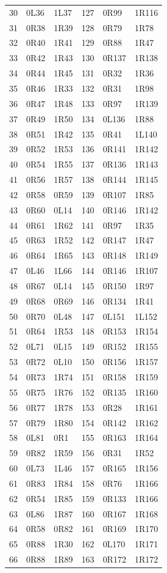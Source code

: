{\begin{longtable}{@{}rll@{\hspace{32pt}}rll@{}}
30&0L36&1L37&127&0R99&1R116\\
31&0R38&1R39&128&0R79&1R78\\
32&0R40&1R41&129&0R88&1R47\\
33&0R42&1R43&130&0R137&1R138\\
34&0R44&1R45&131&0R32&1R36\\
35&0R46&1R33&132&0R31&1R98\\
36&0R47&1R48&133&0R97&1R139\\
37&0R49&1R50&134&0L136&1R88\\
38&0R51&1R42&135&0R41&1L140\\
39&0R52&1R53&136&0R141&1R142\\
40&0R54&1R55&137&0R136&1R143\\
41&0R56&1R57&138&0R144&1R145\\
42&0R58&0R59&139&0R107&1R85\\
43&0R60&0L14&140&0R146&1R142\\
44&0R61&1R62&141&0R97&1R35\\
45&0R63&1R52&142&0R147&1R47\\
46&0R64&1R65&143&0R148&1R149\\
47&0L46&1L66&144&0R146&1R107\\
48&0R67&0L14&145&0R150&1R97\\
49&0R68&0R69&146&0R134&1R41\\
50&0R70&0L48&147&0L151&1L152\\
51&0R64&1R53&148&0R153&1R154\\
52&0L71&0L15&149&0R152&1R155\\
53&0R72&0L10&150&0R156&1R157\\
54&0R73&1R74&151&0R158&1R159\\
55&0R75&1R76&152&0R135&1R160\\
56&0R77&1R78&153&0R28&1R161\\
57&0R79&1R80&154&0R142&1R162\\
58&0L81&0R1&155&0R163&1R164\\
59&0R82&1R59&156&0R31&1R52\\
60&0L73&1L46&157&0R165&1R156\\
61&0R83&1R84&158&0R76&1R166\\
62&0R54&1R85&159&0R133&1R166\\
63&0L86&1R87&160&0R167&1R168\\
64&0R58&0R82&161&0R169&1R170\\
65&0R88&1R30&162&0L170&1R171\\
66&0R88&1R89&163&0R172&1R172\\

\end{longtable}}
